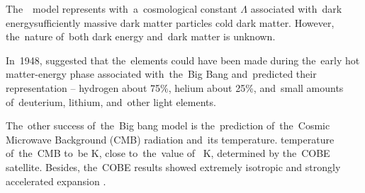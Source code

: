 The~\LCDM\ model represents \DIFdelbegin {}\DIFdelend \DIFaddbegin {}\DIFaddend with~a~cosmological constant \(\Lambda\) \DIFdelbegin {}\DIFdelend \DIFaddbegin {}\DIFaddend associated with~dark energy\DIFdelbegin {}\DIFdelend \DIFaddbegin {}\DIFaddend sufficiently massive dark matter particles \DIFdelbegin {}\DIFdelend \DIFaddbegin {}\DIFaddend cold dark matter. However, the~nature of~both dark energy and~dark matter is unknown.

In~1948, \textcite{PhysRev.74.505.2} suggested that the~elements could have been made during the~early hot matter-energy phase associated with~the~Big Bang and~predicted their representation -- hydrogen about 75\%, helium about 25\%, and~small amounts of~deuterium, lithium, and~other light elements.

The~other \DIFdelbegin {}\DIFdelend success of~the~Big bang model is the~prediction of~the~Cosmic Microwave Background (CMB) radiation and~its temperature. \DIFdelbegin {}\DIFdelend \DIFaddbegin {}\DIFaddend temperature of~the~CMB to~be \DIFdelbegin {}\DIFdelend \DIFaddbegin {} K, \DIFdelbegin {}\DIFdelend \DIFaddbegin {}\DIFaddend close to~the~\DIFdelbegin {}\DIFdelend \DIFaddbegin {}\DIFaddend value of~\DIFdelbegin {} K, determined by the~COBE satellite. Besides, the~COBE results showed \DIFdelbegin {}\DIFdelend \DIFaddbegin {}\DIFaddend extremely isotropic and \DIFdelbegin {}%
\DIFdelend \DIFaddbegin {}\parencite{1981PhRvD..23..347G}\DIFaddend strongly accelerated expansion \DIFdelbegin {}\DIFdelend \DIFaddbegin {}\DIFaddend .

